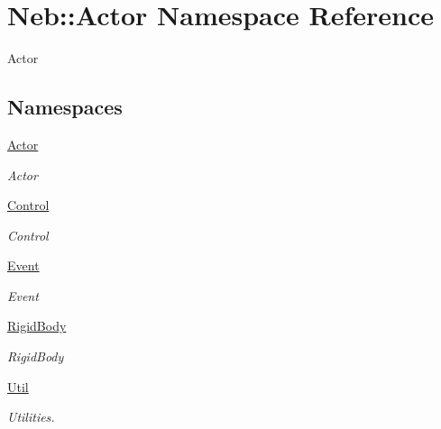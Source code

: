 \hypertarget{namespaceNeb_1_1Actor}{\section{Neb\-:\-:Actor Namespace Reference}
\label{namespaceNeb_1_1Actor}
}


Actor  


\subsection*{Namespaces}
\begin{DoxyCompactItemize}
\item 
\hyperlink{namespaceNeb_1_1Actor_1_1Actor}{Actor}
\begin{DoxyCompactList}\small\item\em Actor \end{DoxyCompactList}\item 
\hyperlink{namespaceNeb_1_1Actor_1_1Control}{Control}
\begin{DoxyCompactList}\small\item\em Control \end{DoxyCompactList}\item 
\hyperlink{namespaceNeb_1_1Actor_1_1Event}{Event}
\begin{DoxyCompactList}\small\item\em Event \end{DoxyCompactList}\item 
\hyperlink{namespaceNeb_1_1Actor_1_1RigidBody}{Rigid\-Body}
\begin{DoxyCompactList}\small\item\em Rigid\-Body \end{DoxyCompactList}\item 
\hyperlink{namespaceNeb_1_1Actor_1_1Util}{Util}
\begin{DoxyCompactList}\small\item\em Utilities. \end{DoxyCompactList}\end{DoxyCompactItemize}
